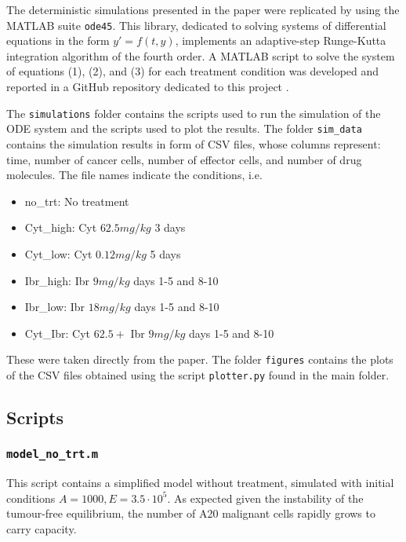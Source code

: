 The deterministic simulations presented in the paper were replicated by using the MATLAB suite \texttt{ode45}. This library, dedicated to solving systems of differential equations in the form $y'=f(t,y)$, implements an adaptive-step Runge-Kutta integration algorithm of the fourth order. 
A MATLAB script to solve the system of equations (1), (2), and (3) for each treatment condition was developed and reported in a GitHub repository dedicated to this project \cite{project-repo}.

The \texttt{simulations} folder contains the scripts used to run the simulation of the ODE system and the scripts used to plot the results. The folder \texttt{sim\_data} contains the simulation results in form of CSV files, whose columns represent: time, number of cancer cells, number of effector cells, and number of drug molecules. The file names indicate the conditions, i.e.
\begin{itemize}
	\item no\_trt: No treatment
	\item Cyt\_high: Cyt $62.5 mg/kg$ 3 days
	\item Cyt\_low: Cyt $0.12 mg/kg$ 5 days
	\item Ibr\_high: Ibr $9 mg/kg$ days 1-5 and 8-10
	\item Ibr\_low: Ibr $18 mg/kg$ days 1-5 and 8-10
	\item Cyt\_Ibr: Cyt $62.5 +$ Ibr $9 mg/kg$ days 1-5 and 8-10
\end{itemize}
These were taken directly from the paper. The folder \texttt{figures} contains the plots of the CSV files obtained using the script \texttt{plotter.py} found in the main folder.\\

\subsection{Scripts}

\subsubsection{\texttt{model\_no\_trt.m}}
This script contains a simplified model without treatment, simulated with initial conditions $A = 1000, E = 3.5 \cdot 10^{5}$. As expected given the instability of the tumour-free equilibrium, the number of A20 malignant cells rapidly grows to carry capacity.

